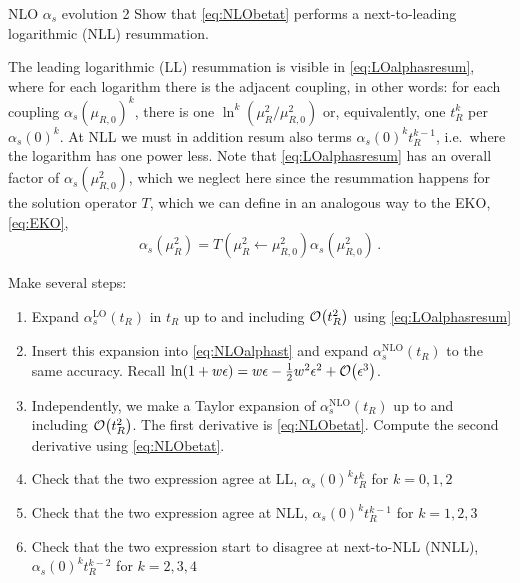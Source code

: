 \begin{exercisebox}[label={box:NLOalphasLL}]{NLO $\alpha_s$ evolution 2}
    Show that \cref{eq:NLObetat} performs a next-to-leading logarithmic (NLL) resummation.
\end{exercisebox}
\noindent{}The leading logarithmic (LL) resummation is visible in \cref{eq:LOalphasresum}, where for each logarithm there is the adjacent coupling, in other words: for each coupling $\alpha_s(\mu_{R,0})^k$, there is one $\ln^k(\mu_R^2/\mu_{R,0}^2)$ or, equivalently, one $t_R^k$ per $\alpha_s(0)^k$.
At NLL we must in addition resum also terms $\alpha_s(0)^k t_R^{k-1}$, i.e.\ where the logarithm has one power less.
Note that \cref{eq:LOalphasresum} has an overall factor of $\alpha_s(\mu_{R,0}^2)$, which we neglect here since the resummation happens for the solution operator $T$, which we can define in an analogous way to the EKO, \cref{eq:EKO},
\begin{equation}
    \alpha_s(\mu_R^2) = T(\mu_R^2 \leftarrow \mu_{R,0}^2) \alpha_s(\mu_{R,0}^2)\,.
\end{equation}

Make several steps:
\begin{enumerate}
    \item Expand $\alpha_s^\text{LO}(t_R)$ in $t_R$ up to and including $\order{t_R^2}$ using \cref{eq:LOalphasresum}
    \item Insert this expansion into \cref{eq:NLOalphast} and expand $\alpha_s^\text{NLO}(t_R)$ to the same accuracy. Recall $\ln(1 + w \epsilon) = w \epsilon - \frac 1 2 w^2 \epsilon^2 + \order{\epsilon^3}$.
    \item Independently, we make a Taylor expansion of $\alpha_s^\text{NLO}(t_R)$ up to and including $\order{t_R^2}$.
        The first derivative is \cref{eq:NLObetat}.
        Compute the second derivative using \cref{eq:NLObetat}.
    \item Check that the two expression agree at LL, $\alpha_s(0)^k t_R^{k}$ for $k=0,1,2$
    \item Check that the two expression agree at NLL, $\alpha_s(0)^k t_R^{k-1}$ for $k=1,2,3$
    \item Check that the two expression start to disagree at next-to-NLL (NNLL), $\alpha_s(0)^k t_R^{k-2}$ for $k=2,3,4$
\end{enumerate}
